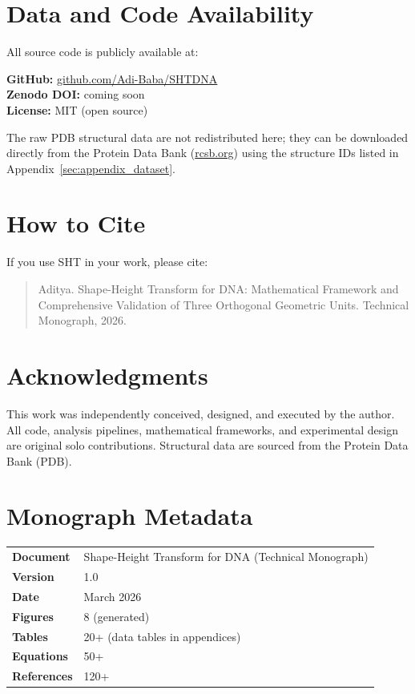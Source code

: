 \section*{Data and Code Availability}

All source code is publicly available at:
\begin{center}
    \textbf{GitHub:} \href{https://github.com/Adi-Baba/SHTDNA}{github.com/Adi-Baba/SHTDNA} \\
    \textbf{Zenodo DOI:} coming soon \\
    \textbf{License:} MIT (open source)
\end{center}

The raw PDB structural data are not redistributed here; they can be downloaded directly from the Protein Data Bank (\href{https://www.rcsb.org}{rcsb.org}) using the structure IDs listed in Appendix~\ref{sec:appendix_dataset}.

\section*{How to Cite}

If you use SHT in your work, please cite:

\begin{quote}
Aditya. Shape-Height Transform for DNA: Mathematical Framework and Comprehensive Validation of Three Orthogonal Geometric Units. Technical Monograph, 2026.
\end{quote}

\section*{Acknowledgments}

This work was independently conceived, designed, and executed by the author. All code, analysis pipelines, mathematical frameworks, and experimental design are original solo contributions. Structural data are sourced from the Protein Data Bank (PDB).

\section*{Monograph Metadata}

\begin{tabular}{ll}
    \toprule
    \textbf{Document} & Shape-Height Transform for DNA (Technical Monograph) \\
    \textbf{Version} & 1.0 \\
    \textbf{Date} & March 2026 \\
    \textbf{Figures} & 8 (generated) \\
    \textbf{Tables} & 20+ (data tables in appendices) \\
    \textbf{Equations} & 50+ \\
    \textbf{References} & 120+ \\
    \bottomrule
\end{tabular}

\newpage
